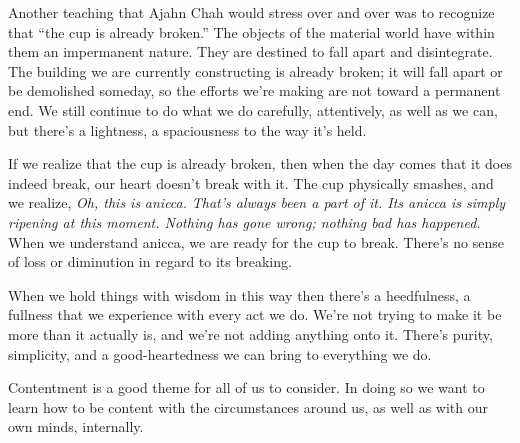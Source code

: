 Another teaching that Ajahn Chah would stress over and over was to 
recognize that ``the cup is already broken.'' The objects of the 
material world have within them an impermanent nature. They are 
destined to fall apart and disintegrate. The building we are currently 
constructing is already broken; it will fall apart or be demolished 
someday, so the efforts we're making are not toward a permanent end. We 
still continue to do what we do carefully, attentively, as well as we 
can, but there's a lightness, a spaciousness to the way it's held.

If we realize that the cup is already broken, then when the day comes 
that it does indeed break, our heart doesn't break with it. The cup 
physically smashes, and we realize, \emph{Oh, this is} \emph{anicca.} 
\emph{That's always been a part of it. Its anicca is simply ripening at 
this moment. Nothing has gone wrong; nothing bad has happened.} When we 
understand anicca, we are ready for the cup to break. There's no sense 
of loss or diminution in regard to its breaking.

When we hold things with wisdom in this way then there's a heedfulness, 
a fullness that we experience with every act we do. We're not trying to 
make it be more than it actually is, and we're not adding anything onto 
it. There's purity, simplicity, and a good-heartedness we can bring to 
everything we do.


Contentment is a good theme for all of us to consider. In doing so we 
want to learn how to be content with the circumstances around us, as 
well as with our own minds, internally.


